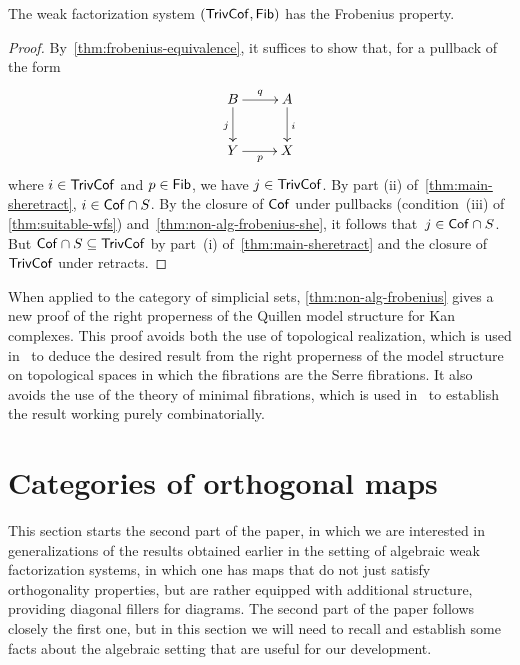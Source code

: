 \documentclass[reqno,10pt,a4paper,oneside,draft]{amsart}
\begin{document}
{{\begin{theorem} \label{thm:non-alg-frobenius}
The weak factorization system $(\mathsf{TrivCof}, \mathsf{Fib})$ has the Frobenius property. 
\end{theorem}

\begin{proof} By~\cref{thm:frobenius-equivalence}, it suffices to show that, for a pullback of the form
\begin{equation*}
\begin{gathered}
\xymatrix{
 B \ar[d]_j \ar[r]^q & A \ar[d]^i \\ 
Y \ar[r]_p & X }
\end{gathered}
\end{equation*}
where $i  \in \mathsf{TrivCof}$ and  $p \in \mathsf{Fib}$, we have $j \in \mathsf{TrivCof}$. 
By part (ii) of~\cref{thm:main-sheretract}, $i \in \mathsf{Cof} \cap S$. By the closure of $\mathsf{Cof}$ under pullbacks (condition~(iii) of \cref{thm:suitable-wfs}) and~\cref{thm:non-alg-frobenius-she},
it follows that~$j \in \mathsf{Cof} \cap S$. But $\mathsf{Cof} \cap S \subseteq \mathsf{TrivCof}$ by part~(i) of~\cref{thm:main-sheretract} and 
the closure of $\mathsf{TrivCof}$ under retracts.
\end{proof}


\begin{remark} 
When applied to the category of simplicial sets, \cref{thm:non-alg-frobenius} gives a new proof of the right properness of the Quillen model structure for Kan complexes. This proof avoids both the use of topological realization, which is used in~\cite[Theorem~13.1.13]{hirschhorn-model-localizations} to deduce the desired result from the right properness of the model structure on topological spaces in which the fibrations are the Serre fibrations. It also avoids the use of the theory of minimal fibrations, which is used in~\cite[Theorem~1.7.1]{joyal-tierney-notes} to establish the result working purely combinatorially.
\end{remark} 





\section{Categories of orthogonal maps}
\label{sec:ortf}

This section starts the second part of the paper, in which we are interested in generalizations of the results obtained earlier in the setting
of algebraic weak factorization systems, in which one has maps that do not just satisfy orthogonality properties, but are rather equipped
with additional structure, providing diagonal fillers for diagrams. The second part of the paper follows closely the first one, but in this section
we will need to recall and establish some facts about the algebraic setting that are useful for our development. 

}}
\end{document}

